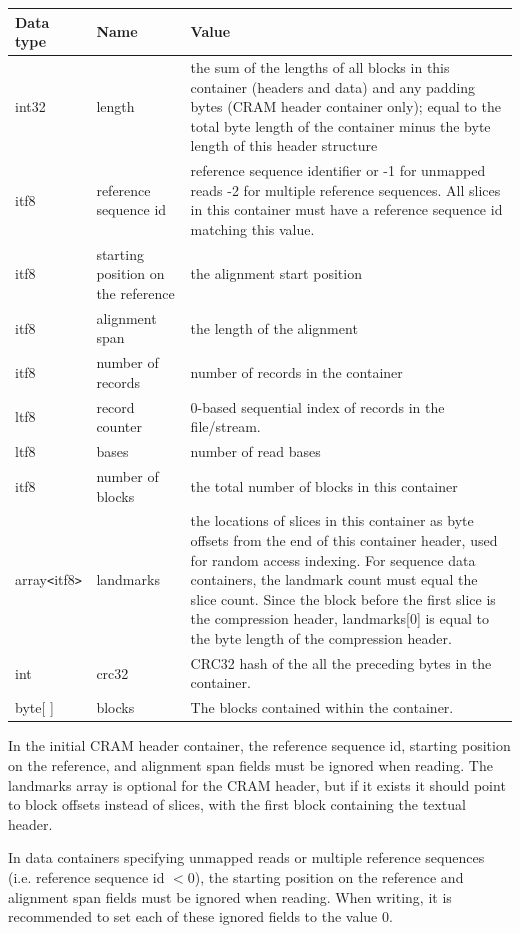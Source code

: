 \documentclass[a4paper]{article}
\begin{document}
\begin{tabular}{|l|>{\raggedright}p{120pt}|>{\raggedright}p{260pt}|}
\hline
\textbf{Data type} & \textbf{Name} & \textbf{Value}
\tabularnewline
\hline
int32 & length & the sum of the lengths of all blocks in this
container (headers and data) and any padding bytes (CRAM header
container only);
equal to the total byte length of the container minus the byte length of this header structure\tabularnewline
\hline
itf8 & reference sequence id & reference sequence identifier  or\linebreak{}
-1 for unmapped reads\linebreak{}
-2 for multiple reference sequences.\linebreak{}
All slices in this container must have a reference sequence id matching this value.\tabularnewline
\hline
itf8 & starting position on the reference & the alignment start position\tabularnewline
\hline
itf8 & alignment span & the length of the alignment\tabularnewline
\hline
itf8 & number of records & number of records in the container\tabularnewline
\hline
ltf8 & record counter & 0-based sequential index of records in the file/stream.\tabularnewline
\hline
ltf8 & bases & number of read bases\tabularnewline
\hline
itf8 & number of blocks & the total number of blocks in this container\tabularnewline
\hline
array\texttt{<}itf8\texttt{>} & landmarks & the locations of slices in this container as byte offsets from the end of
this container header, used for random access indexing.
For sequence data containers, the landmark count must equal the slice count.\linebreak{}
Since the block before the first slice is the compression header,
landmarks[0] is equal to the byte length of the compression header.\tabularnewline
\hline
int & crc32 & CRC32 hash of the all the preceding bytes in the container.\tabularnewline
\hline
byte[ ] & blocks & The blocks contained within the container.\tabularnewline
\hline
\end{tabular}

In the initial CRAM header container, the reference sequence id,
starting position on the reference, and alignment span fields must be
ignored when reading. The landmarks array is optional for the CRAM
header, but if it exists it should point to block offsets instead of
slices, with the first block containing the textual header.

In data containers specifying unmapped reads or multiple reference
sequences (i.e. reference sequence id $< 0$), the starting position on
the reference and alignment span fields must be ignored when
reading. When writing, it is recommended to set each of these ignored
fields to the value 0.
\end{document}
